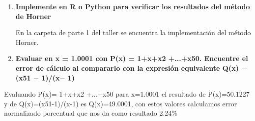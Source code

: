\documentclass[12pt]{article}
\renewcommand{\_}{\kern-1.5pt\textunderscore\kern-1.5pt}
\begin{document}
\begin{enumerate}
\begin{justify}
{\fontsize{10pt}{12.0pt}\selectfont La cual es equivalente a Pk+1(x0), quedando demostrado el número de multiplicaciones iguales a k, el grado del polinomio.\par}
\end{justify}\par


\vspace{\baselineskip}
\setlength{\parskip}{8.04pt}
\setlength{\parskip}{0.0pt}
	\item {\fontsize{10pt}{12.0pt}\selectfont  \textbf{Implemente en R o Python para veriﬁcar los resultados del método de Horner}\par}\par

\begin{justify}
{\fontsize{10pt}{12.0pt}\selectfont \textbf{ }En la carpeta de parte 1 del taller se encuentra la implementación del método Horner.\par}
\end{justify}\par


\vspace{\baselineskip}
\setlength{\parskip}{8.04pt}
\setlength{\parskip}{0.0pt}
	\item {\fontsize{10pt}{12.0pt}\selectfont \textbf{ Evaluar en x = 1.0001 con P(x) = 1+x+x2 +...+x50. Encuentre el error de cálculo al compararlo con la expresión equivalente Q(x) = (x51 $-$ 1)/(x$-$ 1)}\par}
\end{enumerate}\par


\vspace{\baselineskip}
\setlength{\parskip}{8.04pt}
\setlength{\parskip}{0.0pt}
\begin{adjustwidth}{1.0in}{0.0in}
\begin{justify}
{\fontsize{10pt}{12.0pt}\selectfont Evaluando P(x)= 1+x+x2 +...+x50 para x=1.0001 el resultado de P(x)=50.1227 y de Q(x)=(x51-1)/(x-1) es Q(x)=49.0001, con estos valores calculamos error normalizado porcentual que nos da como resultado 2.24$\%$ \par}
\end{justify}\par

\end{adjustwidth}

\begin{justify}
{\fontsize{10pt}{12.0pt}\selectfont \textbf{ }\par}
\end{justify}\par
\end{document}
